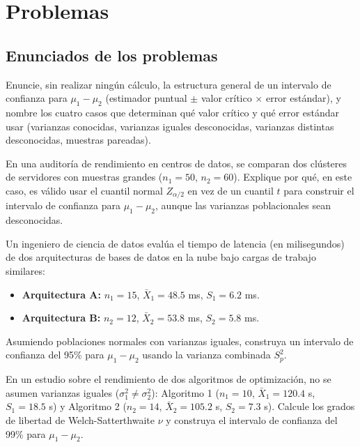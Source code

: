 \section*{Problemas}

\subsection*{Enunciados de los problemas}

\begin{problema}
	\label{prob:3988afe}
	Enuncie, sin realizar ningún cálculo, la estructura general de un intervalo de confianza para $\mu_1-\mu_2$ (estimador puntual $\pm$ valor crítico $\times$ error estándar), y nombre los cuatro casos que determinan qué valor crítico y qué error estándar usar (varianzas conocidas, varianzas iguales desconocidas, varianzas distintas desconocidas, muestras pareadas).
\end{problema}

\begin{problema}
	\label{prob:7eaa452}
	En una auditoría de rendimiento en centros de datos, se comparan dos clústeres de servidores con muestras grandes ($n_1=50$, $n_2=60$). Explique por qué, en este caso, es válido usar el cuantil normal $Z_{\alpha/2}$ en vez de un cuantil $t$ para construir el intervalo de confianza para $\mu_1-\mu_2$, aunque las varianzas poblacionales sean desconocidas.
\end{problema}

\begin{problema}
	\label{prob:f1e6f4b}
	Un ingeniero de ciencia de datos evalúa el tiempo de latencia (en milisegundos) de dos arquitecturas de bases de datos en la nube bajo cargas de trabajo similares:
	\begin{itemize}
		\item \textbf{Arquitectura A:} $n_1=15$, $\bar{X}_1=48.5$ ms, $S_1=6.2$ ms.
		\item \textbf{Arquitectura B:} $n_2=12$, $\bar{X}_2=53.8$ ms, $S_2=5.8$ ms.
	\end{itemize}
	Asumiendo poblaciones normales con varianzas iguales, construya un intervalo de confianza del 95\% para $\mu_1-\mu_2$ usando la varianza combinada $S_p^2$.
\end{problema}

\begin{problema}
	\label{prob:51e0d64}
	En un estudio sobre el rendimiento de dos algoritmos de optimización, no se asumen varianzas iguales ($\sigma_1^2\neq\sigma_2^2$): Algoritmo 1 ($n_1=10$, $\bar X_1=120.4$ s, $S_1=18.5$ s) y Algoritmo 2 ($n_2=14$, $\bar X_2=105.2$ s, $S_2=7.3$ s). Calcule los grados de libertad de Welch-Satterthwaite $\nu$ y construya el intervalo de confianza del 99\% para $\mu_1-\mu_2$.
\end{problema}

